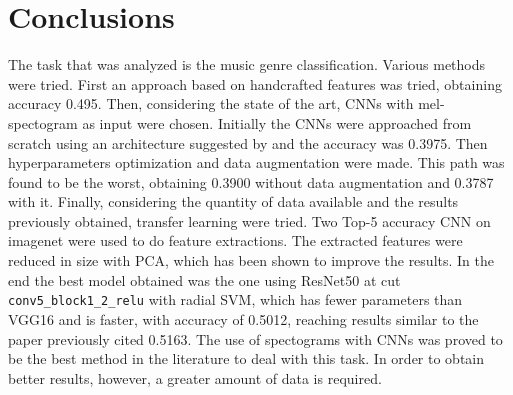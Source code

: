 \section{Conclusions}
The task that was analyzed is the music genre classification.
Various methods were tried.
First an approach based on handcrafted features was tried, obtaining accuracy 0.495.
Then, considering the state of the art, CNNs with mel-spectogram as input were chosen. 
Initially the CNNs were approached from scratch using an architecture suggested by \cite{kostrzewa2021music} and the accuracy was 0.3975. 
Then hyperparameters optimization and data augmentation were made. 
This path was found to be the worst, obtaining 0.3900 without data augmentation and 0.3787 with it.
Finally, considering the quantity of data available and the results previously obtained, transfer learning were tried.
Two Top-5 accuracy CNN on imagenet were used to do feature extractions.
The extracted features were reduced in size with PCA, which has been shown to improve the results.
In the end the best model obtained was the one using ResNet50 at cut \texttt{conv5\_block1\_2\_relu} with radial SVM, which has fewer parameters than VGG16 and is faster, with accuracy of 0.5012, reaching results similar to the paper previously cited 0.5163.
The use of spectograms with CNNs was proved to be the best method in the literature to deal with this task.
In order to obtain better results, however, a greater amount of data is required.
